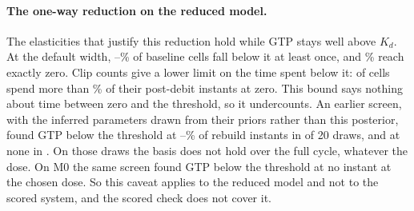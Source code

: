 \paragraph{The one-way reduction on the reduced model.} The elasticities that justify this reduction hold while GTP stays well above $K_d$. At the default width, --\% of baseline cells fall below it at least once, and \% reach exactly zero. Clip counts give a lower limit on the time spent below it:
 of  cells spend more than \% of their
post-debit instants at zero. This bound says nothing about time between zero and the
threshold, so it undercounts. An earlier screen, with the inferred parameters drawn from
their priors rather than this posterior, found GTP below the threshold at
--\% of rebuild instants in  of 20 draws,
and at none in . On those draws the basis does not hold over the full
cycle, whatever the dose. On M0 the same screen found GTP below the threshold at no
instant at the chosen dose. So this caveat applies to the reduced model and not to the
scored system, and the scored check does not cover it.
